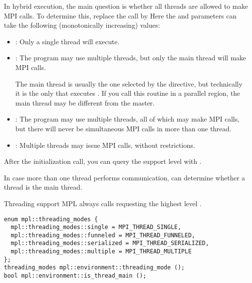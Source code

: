 In hybrid execution, the main question is whether all threads
are allowed to make MPI calls. To determine this,
replace the  call by
%
%
Here the  and  parameters can take the following
(monotonically increasing) values:
\begin{itemize}
\item {}: Only a single thread will
  execute.
\item{}: The program may use multiple
  threads, but only the main thread will make MPI calls.

    The main thread is usually the one selected by the
     directive, but technically it is the only that
    executes . If you call this routine in
    a parallel region, the main thread may be different from the master.
\item{}: The program may use multiple
  threads, all of which may make MPI calls, but there will never be
  simultaneous MPI calls in more than one thread.
\item{}: Multiple threads may issue MPI
  calls, without restrictions.
\end{itemize}

After the initialization call, you can query the support level
with .

In case more than one thread performs communication, 
can determine whether a thread is the main thread.

\begin{mplnote}{Threading support}
  \ac{MPL} always calls 
  requesting the highest level .
\begin{lstlisting}
enum mpl::threading_modes {
  mpl::threading_modes::single = MPI_THREAD_SINGLE, 
  mpl::threading_modes::funneled = MPI_THREAD_FUNNELED,
  mpl::threading_modes::serialized = MPI_THREAD_SERIALIZED,
  mpl::threading_modes::multiple = MPI_THREAD_MULTIPLE
};
threading_modes mpl::environment::threading_mode ();
bool mpl::environment::is_thread_main ();
\end{lstlisting}
\end{mplnote}

